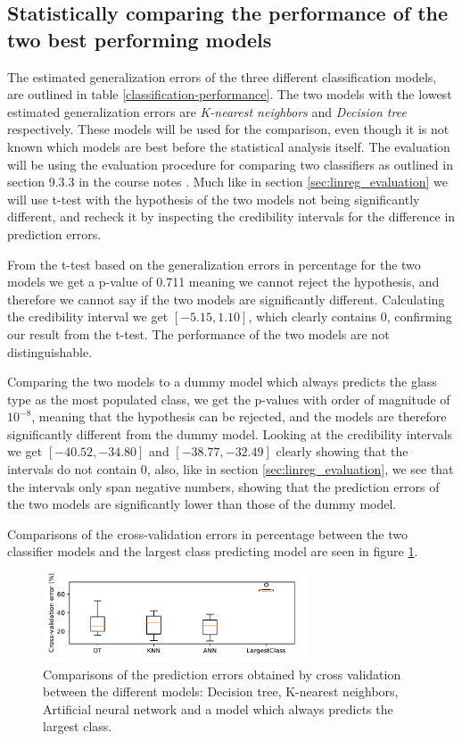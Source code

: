\subsection{Statistically comparing the performance of the two best performing models}

The estimated generalization errors of the three different classification models, are outlined in table \ref{classification-performance}. The two models with the lowest estimated generalization errors are \textit{K-nearest neighbors} and \textit{Decision tree} respectively. These models will be used for the comparison, even though it is not known which models are best before the statistical analysis itself. The evaluation will be using the evaluation procedure for comparing two classifiers as outlined in section 9.3.3 in the course notes \cite{coursenotes}. Much like in section \ref{sec:linreg_evaluation} we will use t-test with the hypothesis of the two models not being significantly different, and recheck it by inspecting the credibility intervals for the difference in prediction errors.

From the t-test based on the generalization errors in percentage for the two models we get a p-value of 0.711 meaning we cannot reject the hypothesis, and therefore we cannot say if the two models are significantly different. Calculating the credibility interval we get $[-5.15, 1.10]$, which clearly contains 0, confirming our result from the t-test. The performance of the two models are not distinguishable.

Comparing the two models to a dummy model which always predicts the glass type as the most populated class, we get the p-values with order of magnitude of $10^{-8}$, meaning that the hypothesis can be rejected, and the models are therefore significantly different from the dummy model. Looking at the credibility intervals we get $[-40.52, -34.80]$ and $[-38.77, -32.49]$ clearly showing that the intervals do not contain 0, also, like in section \ref{sec:linreg_evaluation}, we see that the intervals only span negative numbers, showing that the prediction errors of the two models are significantly lower than those of the dummy model.

Comparisons of the cross-validation errors in percentage between the two classifier models and the largest class predicting model are seen in figure \ref{fig:cv_clas}.

\begin{figure}[H]
    \centering
    \includegraphics[width=0.7\textwidth]{fig/ClassifierEvaluation.pdf}
    \caption{Comparisons of the prediction errors obtained by cross validation between the different models: Decision tree, K-nearest neighbors, Artificial neural network and a model which always predicts the largest class.}
    \label{fig:cv_clas}
\end{figure}

